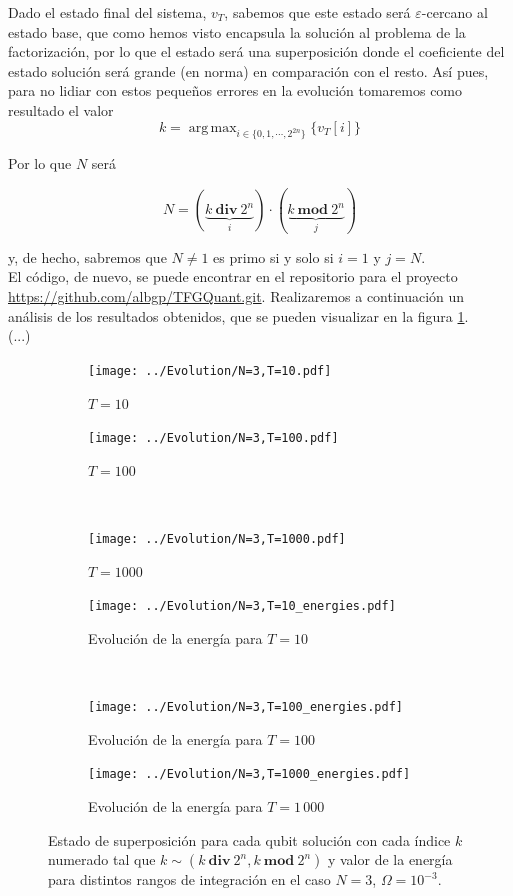 \documentclass[11pt, spanish]{report}
\DeclareMathOperator*{\argmax}{arg\,max}
\numberwithin{equation}{section}
\numberwithin{defin}{section}
\begin{document}
Dado el estado final del sistema, $v_T$, sabemos que este estado será $\varepsilon$-cercano al estado base, que como hemos visto encapsula la solución al problema de la factorización, por lo que el estado será una superposición donde el coeficiente del estado solución será grande (en norma) en comparación con el resto. Así pues, para no lidiar con estos pequeños errores en la evolución tomaremos como resultado el valor
\begin{equation}
k=\argmax_{i\in \{0,1,\cdots,2^{2n}\}}\{v_T[i] \}
\end{equation}

Por lo que $N$ será 

\begin{equation}
N=(\underbrace{k\ \mathbf{div}\ 2^n}_i)\cdot(\underbrace{k\ \mathbf{mod}\ 2^n}_j)
\end{equation}

y, de hecho, sabremos que $N\neq 1$ es primo si y solo si $i=1$ y $j=N$.\\

El código, de nuevo, se puede encontrar en el repositorio para el proyecto \url{https://github.com/albgp/TFGQuant.git}. Realizaremos a continuación un análisis de los resultados obtenidos, que se pueden visualizar en la figura \ref{FigRes}.\\

(...)

\begin{figure}
\begin{subfigure}{.5\textwidth}
  \centering
  \texttt{[image: ../Evolution/N=3,T=10.pdf]}
  \caption{$T=10$}
\end{subfigure}%
\begin{subfigure}{.5\textwidth}
  \centering
  \texttt{[image: ../Evolution/N=3,T=100.pdf]}
  \caption{$T=100$}
\end{subfigure}\\
\begin{subfigure}{.5\textwidth}
  \centering
  \texttt{[image: ../Evolution/N=3,T=1000.pdf]}
  \caption{$T=1000$}
\end{subfigure}%
\begin{subfigure}{.5\textwidth}
  \centering
  \texttt{[image: ../Evolution/N=3,T=10\_energies.pdf]}
  \caption{Evolución de la energía para $T=10$}
\end{subfigure}\\
\begin{subfigure}{.5\textwidth}
  \centering
  \texttt{[image: ../Evolution/N=3,T=100\_energies.pdf]}
  \caption{Evolución de la energía para $T=100$}
\end{subfigure}%
\begin{subfigure}{.5\textwidth}
  \centering
  \texttt{[image: ../Evolution/N=3,T=1000\_energies.pdf]}
  \caption{Evolución de la energía para $T=1\, 000$}
\end{subfigure}
\caption{Estado de superposición para cada qubit solución con cada índice $k$ numerado tal que $k\sim(k\ \mathbf{div}\ 2^n,k\ \mathbf{mod}\ 2^n)$ y valor de la energía para distintos rangos de integración en el caso $N=3$, $\Omega=10^{-3}$.}\label{FigRes}
\end{figure}
 
\end{document}
